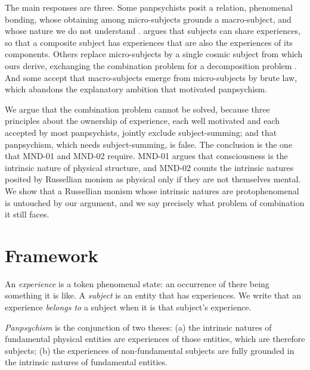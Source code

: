 \documentclass{situationist-preprint}
\begin{document}
The main responses are three. Some panpsychists posit a relation, phenomenal bonding, whose obtaining among micro-subjects grounds a macro-subject, and whose nature we do not understand \citep{Goff2017}. \citet{Roelofs2019} argues that subjects can share experiences, so that a composite subject has experiences that are also the experiences of its components. Others replace micro-subjects by a single cosmic subject from which ours derive, exchanging the combination problem for a decomposition problem \citep{NagasawaWager2016}. And some accept that macro-subjects emerge from micro-subjects by brute law, which abandons the explanatory ambition that motivated panpsychism.

We argue that the combination problem cannot be solved, because three principles about the ownership of experience, each well motivated and each accepted by most panpsychists, jointly exclude subject-summing; and that panpsychism, which needs subject-summing, is false. The conclusion is the one that MND-01 and MND-02 require. MND-01 argues that consciousness is the intrinsic nature of physical structure, and MND-02 counts the intrinsic natures posited by Russellian monism as physical only if they are not themselves mental. We show that a Russellian monism whose intrinsic natures are protophenomenal is untouched by our argument, and we say precisely what problem of combination it still faces.

\section{Framework}

\begin{definition}\label{d:subj}
An \emph{experience} is a token phenomenal state: an occurrence of there being something it is like. A \emph{subject} is an entity that has experiences. We write that an experience \emph{belongs to} a subject when it is that subject's experience.
\end{definition}

\begin{definition}[Panpsychism]\label{d:pan}
\emph{Panpsychism} is the conjunction of two theses: (a) the intrinsic natures of fundamental physical entities are experiences of those entities, which are therefore subjects; (b) the experiences of non-fundamental subjects are fully grounded in the intrinsic natures of fundamental entities.
\end{definition}
\end{document}
